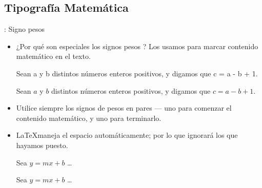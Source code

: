 \documentclass{beamer}
\begin{document}
\subsection{Tipografía Matemática}
\begin{frame}[fragile]{\insertsubsection{}: Signo pesos}
  \begin{itemize}
  \item ¿Por qué son especiales los signos pesos \keystrokebftt{\$}? Los
    usamos para marcar contenido  matemático en el texto.\\[1ex]
    \begin{exampletwouptiny}
Sean a y b distintos n\'umeros 
enteros positivos, y digamos 
que c = a - b + 1.
      
Sean $a$ y $b$ distintos n\'umeros
enteros positivos, y digamos 
que  $c = a - b + 1$.
    \end{exampletwouptiny}
  \item Utilice siempre los signos de pesos en pares --- uno para
    comenzar el contenido matemático, y uno para terminarlo.
  \item \LaTeX maneja el espacio automáticamente; por lo que
    ignorará los que hayamos puesto.
    \begin{exampletwouptiny}
Sea $y=mx+b$ \ldots
      
Sea $y = m x + b$ \ldots
    \end{exampletwouptiny}
  \end{itemize}
\end{frame}
\end{document}
